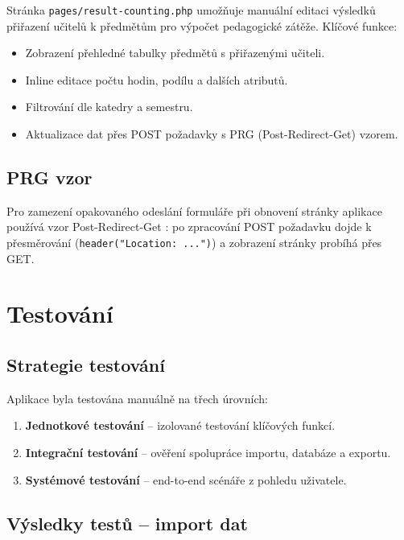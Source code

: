 \documentclass[12pt,a4paper]{report}
\begin{document}
Stránka \texttt{pages/result-counting.php} umožňuje manuální editaci výsledků přiřazení učitelů k předmětům pro výpočet pedagogické zátěže. Klíčové funkce:

\begin{itemize}
  \item Zobrazení přehledné tabulky předmětů s přiřazenými učiteli.
  \item Inline editace počtu hodin, podílu a dalších atributů.
  \item Filtrování dle katedry a semestru.
  \item Aktualizace dat přes POST požadavky s PRG (Post-Redirect-Get) vzorem.
\end{itemize}

\section{PRG vzor}

Pro zamezení opakovaného odeslání formuláře při obnovení stránky aplikace používá vzor Post-Redirect-Get \cite{prg}: po zpracování POST požadavku dojde k přesměrování (\texttt{header("Location: ...")}) a zobrazení stránky probíhá přes GET.

\chapter{Testování}

\section{Strategie testování}

Aplikace byla testována manuálně na třech úrovních:
\begin{enumerate}
  \item \textbf{Jednotkové testování} -- izolované testování klíčových funkcí.
  \item \textbf{Integrační testování} -- ověření spolupráce importu, databáze a exportu.
  \item \textbf{Systémové testování} -- end-to-end scénáře z pohledu uživatele.
\end{enumerate}

\section{Výsledky testů -- import dat}
\end{document}
